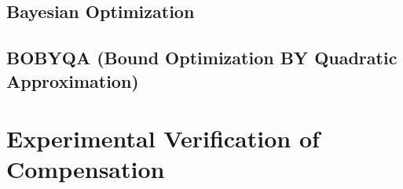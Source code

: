 \subsection{Bayesian Optimization}

\subsection{BOBYQA (Bound Optimization BY Quadratic Approximation)}

\section{Experimental Verification of Compensation}
